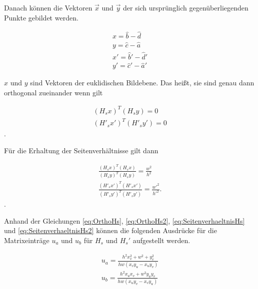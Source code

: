 
Danach können die Vektoren $\vec{x}$ und $\vec{y}$ der sich ursprünglich gegenüberliegenden Punkte gebildet werden.

\begin{gather}
	x = \hat{b}-\hat{d}\\
	y = \hat{c}-\hat{a}\\
	x' = \hat{b}'-\hat{d}'\\
	y' = \hat{c}'-\hat{a}'
\end{gather}

$x$ und $y$ sind Vektoren der euklidischen Bildebene\cite{ZZ}. Das heißt, sie sind genau dann orthogonal zueinander wenn gilt

\begin{gather}
	(H_sx)^T(H_sy)= 0 \label{eq:OrthoHs}\\
	(H'_sx')^T(H'_sy')= 0 \label{eq:OrthoHs2}
\end{gather}.

Für die Erhaltung der Seitenverhältnisse gilt dann

\begin{gather}
	\frac{(H_sx)^T(H_sx)}{(H_sy)^T(H_sy)} = \frac{w^2}{h^2} \label{eq:SeitenverhaeltnisHs}\\
	\frac{(H'_sx')^T(H'_sx')}{(H'_sy')^T(H'_sy')} = \frac{w'^2}{h'^2}\label{eq:SeitenverhaeltnisHs2}	.
\end{gather}.

Anhand der Gleichungen \ref{eq:OrthoHs}, \ref{eq:OrthoHs2}, \ref{eq:SeitenverhaeltnisHs} und \ref{eq:SeitenverhaeltnisHs2} können die folgenden Ausdrücke für die Matrixeinträge $u_a$ und $u_b$ für $H_s$ und $H_s'$ aufgestellt werden\cite{ZZ,Manocha}.


\begin{gather}
u_a = \frac{h^2x_v^2+w^2+y_v^2}{hw(x_vy_u-x_uy_v)}\\
u_b = \frac{h^2x_ux_v+w^2y_uy_v}{hw(x_uy_v-x_vy_u)}
\end{gather}


